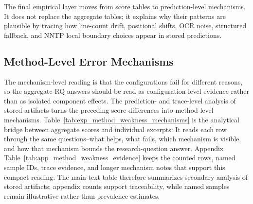 The final empirical layer moves from score tables to prediction-level mechanisms. It does not replace the aggregate tables; it explains why their patterns are plausible by tracing how line-count drift, positional shifts, OCR noise, structured fallback, and NNTP local boundary choices appear in stored predictions.

\FloatBarrier

\subsection{Method-Level Error Mechanisms}
\label{sec:experimentation_method_weaknesses}

The mechanism-level reading is that the configurations fail for different reasons, so the aggregate RQ answers should be read as configuration-level evidence rather than as isolated component effects. The prediction- and trace-level analysis of stored artifacts turns the preceding score differences into method-level mechanisms. Table~\ref{tab:exp_method_weakness_mechanisms} is the analytical bridge between aggregate scores and individual excerpts: It reads each row through the same questions--what helps, what fails, which mechanism is visible, and how that mechanism bounds the research-question answer. Appendix Table~\ref{tab:app_method_weakness_evidence} keeps the counted rows, named sample IDs, trace evidence, and longer mechanism notes that support this compact reading. The main-text table therefore summarizes secondary analysis of stored artifacts; appendix counts support traceability, while named samples remain illustrative rather than prevalence estimates.

